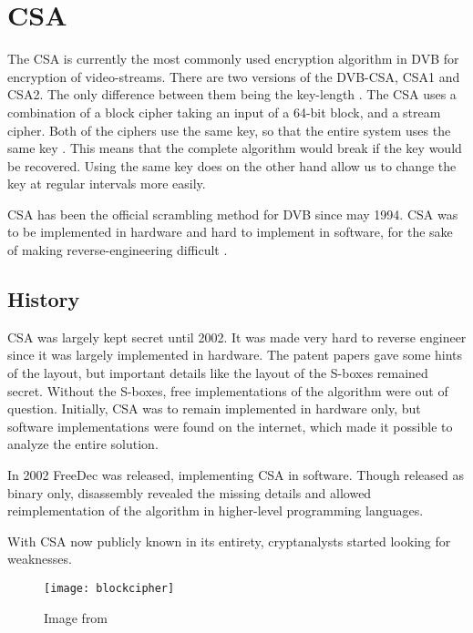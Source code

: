 \chapter{CSA} \label{ch:CSA}
The CSA is currently the most commonly used encryption algorithm in DVB for 
encryption of video-streams. There are two versions of the DVB-CSA, CSA1 and 
CSA2. The only difference between them being the key-length 
\citep[p. 23]{DVBScene:2013}. The CSA uses a combination of a block cipher 
taking an input of a 64-bit block, and a stream cipher. Both of the ciphers use 
the same key, so that the entire system uses the same key 
\citep[pp. 271--272]{WeiLi:2007}. This means that the complete algorithm would 
break if the key would be recovered. Using the same key does on the other hand 
allow us to change the key at regular intervals more easily. 

CSA has been the official scrambling method for DVB since may 1994. CSA was 
to be implemented in hardware and hard to implement in software, for the sake
 of making reverse-engineering difficult \citep{DVBScene:2013}.

\section{History} \label{sec:History}
CSA was largely kept secret until 2002. It was made very hard to reverse engineer
since it was largely implemented in hardware. The patent papers gave some hints
of the layout, but important details like the layout of the S-boxes remained 
secret.
Without the S-boxes, free implementations of the algorithm were out of question. 
Initially, CSA was to remain implemented in hardware only, but software 
implementations were found on the internet, which made it possible to analyze
the entire solution.

In 2002 FreeDec was released, implementing CSA in software. Though released as 
binary only, disassembly revealed the missing details and allowed 
reimplementation of the algorithm in higher-level programming languages. 

With CSA now publicly known in its entirety, cryptanalysts started looking for 
weaknesses.

\begin{figure}
  \begin{center}
    \texttt{[image: blockcipher]}
  \end{center}
  \caption{Image from \citet[pp. 49]{Breaking:2012}}
  \label{fig:blockcipher}
\end{figure}

